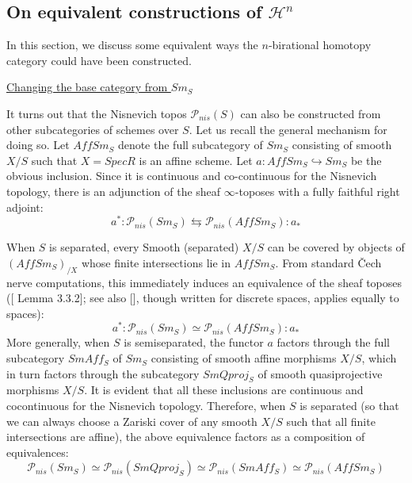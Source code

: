 \subsection{On equivalent constructions of $\mathcal{H}^n$}
In this section, we discuss some equivalent ways the $n$-birational homotopy category could have been constructed.

\underline{{Changing the base category from $Sm_S$}}

It turns out that the Nisnevich topos $\mathcal{P}_{nis}(S)$ can also be constructed from other subcategories of schemes over $S$. Let us recall the general mechanism for doing so. Let $AffSm_S$ denote the full subcategory of $Sm_S$ consisting of smooth $X/S$ such that $X=SpecR$ is an affine scheme. Let $a: AffSm_S\hookrightarrow Sm_S$ be the obvious inclusion. Since it is continuous and co-continuous for the Nisnevich topology, there is an adjunction of the sheaf $\infty$-toposes with a fully faithful right adjoint:
$$a^*:\mathcal{P}_{nis}(Sm_S)\leftrightarrows \mathcal{P}_{nis}(AffSm_S):a_*$$

When $S$ is separated, every Smooth (separated) $X/S$ can be covered by objects of $(AffSm_S)_{/X}$ whose finite intersections lie in $AffSm_S$. From standard \v{C}ech nerve computations, this immediately induces an equivalence of the sheaf toposes ([\cite{MR3679884} Lemma 3.3.2]; see also [\cite[\href{https://stacks.math.columbia.edu/tag/03A0}{Lemma 03A0}]{stacks-project}], though written for discrete spaces, applies equally to spaces):
$$a^*:\mathcal{P}_{nis}(Sm_S)\simeq\mathcal{P}_{nis}(AffSm_S):a_*$$
More generally, when $S$ is semiseparated, the functor $a$ factors through the full subcategory $SmAff_S$ of $Sm_S$ consisting of smooth affine morphisms $X/S$, which in turn factors through the subcategory $SmQproj_S$ of smooth quasiprojective morphisms $X/S$. It is evident that all these inclusions are continuous and cocontinuous for the Nisnevich topology. Therefore, when $S$ is separated (so that we can always choose a Zariski cover of any smooth $X/S$ such that all finite intersections are affine), the above equivalence factors as a composition of equivalences:
$$\mathcal{P}_{nis}(Sm_S)\simeq\mathcal{P}_{nis}(SmQproj_S)\simeq  \mathcal{P}_{nis}(SmAff_S)\simeq  \mathcal{P}_{nis}(AffSm_S)$$


